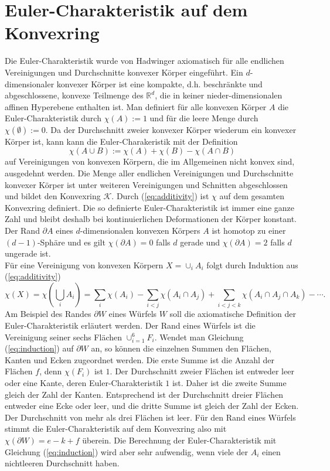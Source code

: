 \section{Euler-Charakteristik auf dem Konvexring}
Die Euler-Charakteristik wurde von Hadwinger \cite{Hadwinger:57} axiomatisch f\"ur alle endlichen Vereinigungen und Durchschnitte konvexer K\"orper eingef\"uhrt.
Ein $d$-dimensionaler konvexer K\"orper ist eine kompakte, d.h. beschr\"ankte und abgeschlossene, konvexe Teilmenge des $\mathbb{R}^d$, die in keiner nieder-dimensionalen affinen Hyperebene enthalten ist. Man definiert f\"ur alle konvexen K\"orper $A$ die Euler-Charakteristik durch $\chi(A):=1$ und f\"ur die leere Menge durch $\chi(\emptyset):=0$. Da der Durchschnitt zweier konvexer K\"orper wiederum ein konvexer K\"orper ist, kann kann die Euler-Charakeristik mit der Definition 
\begin{equation}
  \label{eq:additivity}
\chi(A\cup B):=\chi(A)+\chi(B)-\chi(A \cap B)
\end{equation}
auf Vereinigungen von konvexen K\"orpern, die im Allgemeinen nicht konvex sind, ausgedehnt werden. Die Menge aller endlichen Vereinigungen und Durchschnitte konvexer K\"orper ist unter weiteren Vereinigungen und Schnitten abgeschlossen und bildet den Konvexring $\mathcal{K}$. Durch (\ref{eq:additivity}) ist $\chi$ auf dem gesamten Konvexring definiert. Die so definierte Euler-Charakteristik ist immer eine ganze Zahl und bleibt deshalb bei kontinuierlichen Deformationen der K\"orper konstant. Der Rand $\partial A$ eines $d$-dimensionalen konvexen K\"orpers $A$ ist homotop zu einer $(d-1)$-Sph\"are und es gilt $\chi(\partial A)=0$ falls $d$ gerade und $\chi(\partial A)=2$ falls $d$ ungerade ist.\\
F\"ur eine Vereinigung von konvexen K\"orpern $X=\cup_{i} A_i$ folgt durch Induktion aus (\ref{eq:additivity})
\begin{equation}
\label{eq:induction}
\chi(X) =  \chi\left(\bigcup_i A_i\right)=\sum_i \chi(A_i)-\sum_{i<j} \chi (A_i\cap A_j)  + \sum_{i< j < k}\chi(A_i \cap A_j \cap A_k)- \cdots. 
\end{equation}
Am Beispiel des Randes $\partial W$ eines W\"urfels $W$ soll die axiomatische Definition der Euler-Charakteristik erl\"autert werden. Der Rand eines W\"urfels ist die Vereinigung seiner sechs Fl\"achen $\cup_{i=1}^6 F_i$. Wendet man Gleichung (\ref{eq:induction}) auf $\partial W$ an, so k\"onnen die einzelnen Summen den Fl\"achen, Kanten und Ecken zugeordnet werden.  Die erste Summe ist die Anzahl der Fl\"achen $f$, denn $\chi(F_i)$ ist $1$. Der Durchschnitt zweier Fl\"achen ist entweder leer oder eine Kante, deren Euler-Charakteristik $1$ ist. Daher ist die zweite Summe gleich der Zahl der Kanten. Entsprechend ist der Durchschnitt dreier Fl\"achen entweder eine Ecke oder leer, und die dritte Summe ist gleich der Zahl der Ecken. Der Durchschnitt von mehr als drei Fl\"achen ist leer. F\"ur den Rand eines W\"urfels stimmt die Euler-Charakteristik auf dem Konvexring also mit $\chi(\partial W)=e-k+f$ \"uberein. Die Berechnung der Euler-Charakteristik mit Gleichung (\ref{eq:induction}) wird aber sehr aufwendig, wenn viele der $A_i$ einen nichtleeren Durchschnitt haben.
